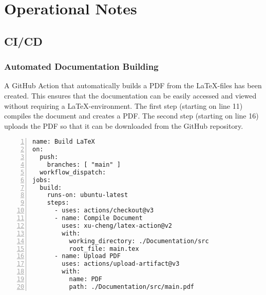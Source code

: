 \chapter{Operational Notes}

\section{CI/CD}

\subsection{Automated Documentation Building}

A GitHub Action that automatically builds a PDF from the \LaTeX-files has been created.
This ensures that the documentation can be easily accessed and viewed without requiring a \LaTeX-environment.
The first step (starting on line 11) compiles the document and creates a PDF.
The second step (starting on line 16) uploads the PDF so that it can be downloaded from the GitHub repository.

\begin{Verbatim}[samepage=true,numbers=left,xleftmargin=7.5mm]
name: Build LaTeX
on:
  push:
    branches: [ "main" ]
  workflow_dispatch:
jobs:
  build:
    runs-on: ubuntu-latest
    steps:
      - uses: actions/checkout@v3
      - name: Compile Document
        uses: xu-cheng/latex-action@v2
        with:
          working_directory: ./Documentation/src
          root_file: main.tex
      - name: Upload PDF
        uses: actions/upload-artifact@v3
        with:
          name: PDF
          path: ./Documentation/src/main.pdf
\end{Verbatim}
            